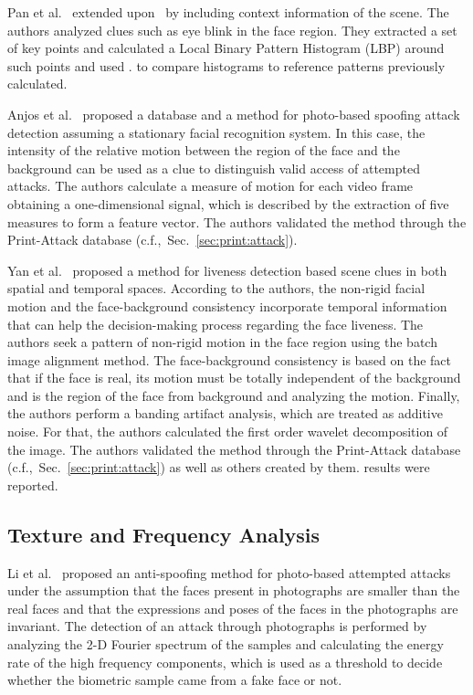 \documentclass[journal]{IEEEtran}
\providecommand{\rv}[1]{{\protect\color{black}{#1}}}
\providecommand{\bmark}[1]{{\protect\color{black}{#1}}}
\begin{document}
Pan et al.~\cite{Pan:TS:2011} extended upon~\cite{Pan:ICCV:2007} by including context information of the scene. The authors analyzed clues such as eye blink in the face region. They extracted a set of key points and calculated a Local Binary Pattern Histogram (LBP) around such points and used . \rv{the  $\chi^{2}$ distance function} to compare histograms to reference patterns previously calculated. 

Anjos et al.~\cite{Anjos:IJCB:2011} proposed a database and a method for photo-based spoofing attack detection assuming a stationary facial recognition system. In this case, the intensity of the relative motion between the region of the face and the background can be used as a clue to distinguish valid access of attempted attacks. The authors calculate a measure of motion for each video frame obtaining a one-dimensional signal, which is described by the extraction of five measures to form a feature vector. The authors validated the method through the Print-Attack database (c.f.,~Sec.~\ref{sec:print:attack}). 

Yan et al.~\cite{Yan:ICARCV:2012} proposed a method for liveness detection based \rv{on three} scene clues in both spatial and temporal spaces. According to the authors, the non-rigid facial motion and the face-background consistency  incorporate temporal information that can help the decision-making process regarding the face liveness. The authors seek a pattern of non-rigid motion in the face region using the batch image alignment method. The face-background consistency is based on the fact that if the face is real, its motion must be totally independent of the background and is \bmark{performed by separating} the region of the face from background and analyzing the motion. Finally, the authors perform a banding artifact analysis, which are treated as additive noise. For that, the authors calculated the first order wavelet decomposition of the image. The authors validated the method through the Print-Attack database (c.f.,~Sec.~\ref{sec:print:attack}) as well as others created by them. \rv{Good} results were reported.

\subsection{Texture and Frequency Analysis}

Li et al.~\cite{Li:BTHI:2004} proposed an anti-spoofing method for photo-based attempted attacks under the assumption that the faces present in photographs are smaller than the real faces and that the expressions and poses of the faces in the photographs are invariant. The detection of an attack through photographs is performed by analyzing the 2-D Fourier spectrum of the samples and calculating the energy rate of the high frequency components, which is used as a threshold to decide whether the biometric sample came from a fake face or not.
\end{document}
